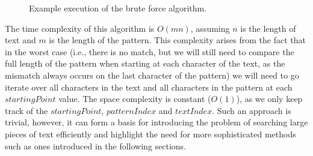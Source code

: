 \begin{figure}[t]
    \centering
    \caption{Example execution of the brute force algorithm.}
    \label{alg:brute_force_exec}
\end{figure}


The time complexity of this algorithm is $O(mn)$, assuming $n$ is the length of text and $m$ is the length of the pattern. This complexity arises from the fact that in the worst case (i.e., there is no match, but we will still need to compare the full length of the pattern when starting at each character of the text, as the mismatch always occurs on the last character of the pattern) we will need to go iterate over all characters in the text and all characters in the pattern at each $\mathit{startingPoint}$ value. The space complexity is constant ($O(1)$), as we only keep track of the $\mathit{startingPoint}$, $\mathit{patternIndex}$ and $\mathit{textIndex}$. Such an approach is trivial,  however, it can form a basis for introducing the problem of searching large pieces of text efficiently and highlight the need for more sophisticated methods such as ones introduced in the following sections.


